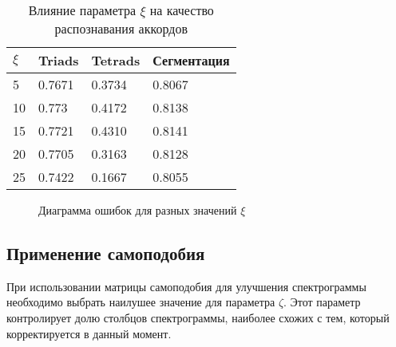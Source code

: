 \begin{table} [htbp]
  \centering
  \parbox{15cm}{\caption{Влияние параметра $\xi$ на качество распознавания
  аккордов} \label{Txi}}
  \begin{tabular}{|l|l|l|l|}
  \hline
  $\xi$ & Triads & Tetrads & Сегментация \\
  \hline
  5 & 0.7671 & 0.3734 & 0.8067 \\
  10 & 0.773 & 0.4172 & 0.8138 \\
  15 & 0.7721 & 0.4310 & 0.8141 \\
  20 & 0.7705 & 0.3163 & 0.8128 \\
  25 & 0.7422 & 0.1667 & 0.8055 \\
  \hline
  \end{tabular}
\end{table}

\begin{figure}[h]
  \begin{minipage}[h]{0.49\linewidth}
  \end{minipage}
  \hfill
  \begin{minipage}[h]{0.49\linewidth}
  \end{minipage}
  \hfill
  \begin{minipage}[h]{0.49\linewidth}
  \end{minipage}
  \hfill
  \begin{minipage}[h]{0.49\linewidth}
  \end{minipage}
  \caption{Диаграмма ошибок для разных значений $\xi$}
  \label{img:xi}
\end{figure}

\subsection{Применение самоподобия} \label{ssect3_selfsim}

При использовании матрицы самоподобия для улучшения спектрограммы необходимо
выбрать наилушее значение для параметра $\zeta$. Этот параметр контролирует
долю столбцов спектрограммы, наиболее схожих с тем, который корректируется в
данный момент.

